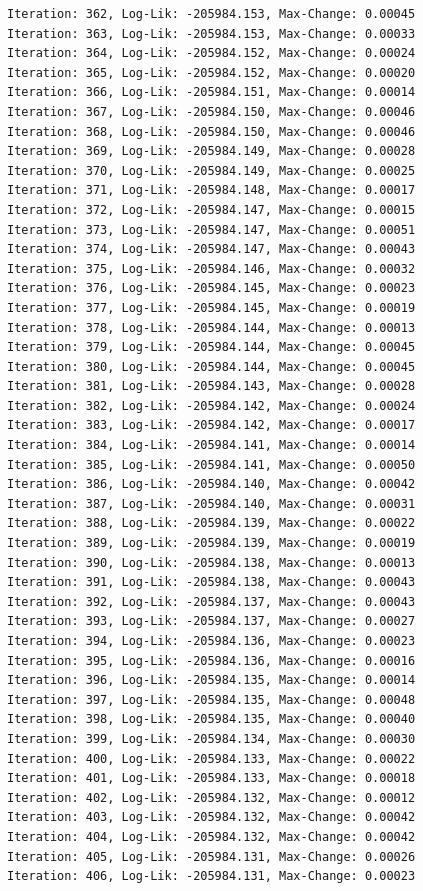 \documentclass[
  letterpaper,
  DIV=11,
  numbers=noendperiod]{scrreport}
\begin{document}
\begin{verbatim}
Iteration: 362, Log-Lik: -205984.153, Max-Change: 0.00045
Iteration: 363, Log-Lik: -205984.153, Max-Change: 0.00033
Iteration: 364, Log-Lik: -205984.152, Max-Change: 0.00024
Iteration: 365, Log-Lik: -205984.152, Max-Change: 0.00020
Iteration: 366, Log-Lik: -205984.151, Max-Change: 0.00014
Iteration: 367, Log-Lik: -205984.150, Max-Change: 0.00046
Iteration: 368, Log-Lik: -205984.150, Max-Change: 0.00046
Iteration: 369, Log-Lik: -205984.149, Max-Change: 0.00028
Iteration: 370, Log-Lik: -205984.149, Max-Change: 0.00025
Iteration: 371, Log-Lik: -205984.148, Max-Change: 0.00017
Iteration: 372, Log-Lik: -205984.147, Max-Change: 0.00015
Iteration: 373, Log-Lik: -205984.147, Max-Change: 0.00051
Iteration: 374, Log-Lik: -205984.147, Max-Change: 0.00043
Iteration: 375, Log-Lik: -205984.146, Max-Change: 0.00032
Iteration: 376, Log-Lik: -205984.145, Max-Change: 0.00023
Iteration: 377, Log-Lik: -205984.145, Max-Change: 0.00019
Iteration: 378, Log-Lik: -205984.144, Max-Change: 0.00013
Iteration: 379, Log-Lik: -205984.144, Max-Change: 0.00045
Iteration: 380, Log-Lik: -205984.144, Max-Change: 0.00045
Iteration: 381, Log-Lik: -205984.143, Max-Change: 0.00028
Iteration: 382, Log-Lik: -205984.142, Max-Change: 0.00024
Iteration: 383, Log-Lik: -205984.142, Max-Change: 0.00017
Iteration: 384, Log-Lik: -205984.141, Max-Change: 0.00014
Iteration: 385, Log-Lik: -205984.141, Max-Change: 0.00050
Iteration: 386, Log-Lik: -205984.140, Max-Change: 0.00042
Iteration: 387, Log-Lik: -205984.140, Max-Change: 0.00031
Iteration: 388, Log-Lik: -205984.139, Max-Change: 0.00022
Iteration: 389, Log-Lik: -205984.139, Max-Change: 0.00019
Iteration: 390, Log-Lik: -205984.138, Max-Change: 0.00013
Iteration: 391, Log-Lik: -205984.138, Max-Change: 0.00043
Iteration: 392, Log-Lik: -205984.137, Max-Change: 0.00043
Iteration: 393, Log-Lik: -205984.137, Max-Change: 0.00027
Iteration: 394, Log-Lik: -205984.136, Max-Change: 0.00023
Iteration: 395, Log-Lik: -205984.136, Max-Change: 0.00016
Iteration: 396, Log-Lik: -205984.135, Max-Change: 0.00014
Iteration: 397, Log-Lik: -205984.135, Max-Change: 0.00048
Iteration: 398, Log-Lik: -205984.135, Max-Change: 0.00040
Iteration: 399, Log-Lik: -205984.134, Max-Change: 0.00030
Iteration: 400, Log-Lik: -205984.133, Max-Change: 0.00022
Iteration: 401, Log-Lik: -205984.133, Max-Change: 0.00018
Iteration: 402, Log-Lik: -205984.132, Max-Change: 0.00012
Iteration: 403, Log-Lik: -205984.132, Max-Change: 0.00042
Iteration: 404, Log-Lik: -205984.132, Max-Change: 0.00042
Iteration: 405, Log-Lik: -205984.131, Max-Change: 0.00026
Iteration: 406, Log-Lik: -205984.131, Max-Change: 0.00023

\end{verbatim}
\end{document}
